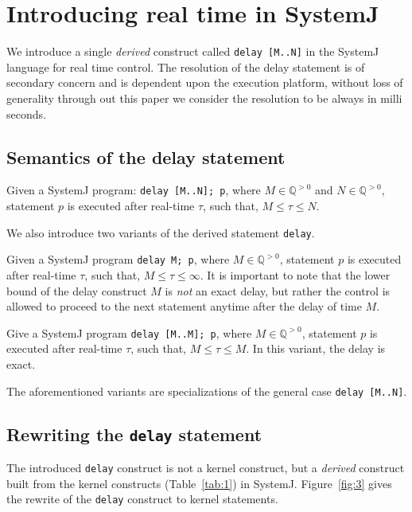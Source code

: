 \section{Introducing real time in SystemJ}
\label{sec:intr-real-time}

We introduce a single \textit{derived} construct called
\mbox{\texttt{delay [M..N]}} in the SystemJ language for real time
control. The resolution of the delay statement is of secondary concern
and is dependent upon the execution platform, without loss of generality
through out this paper we consider the resolution to be always in milli
seconds.

\subsection{Semantics of the delay statement}
\label{sec:semant-delay-stat}

Given a SystemJ program: \texttt{delay [M..N]; p}, where $M \in
\mathbb{Q}^{>0}$ and $N \in \mathbb{Q}^{>0}$, statement $p$ is executed
after real-time $\tau$, such that, $M \leq \tau \leq N$.

We also introduce two variants of the derived statement \texttt{delay}.
\begin{enumerate*}
\item Given a SystemJ program \texttt{delay M; p}, where $M \in
  \mathbb{Q}^{>0}$, statement $p$ is executed after real-time $\tau$,
  such that, $M \leq \tau \leq \infty$. It is important to note that the
  lower bound of the delay construct $M$ is \textit{not} an exact delay,
  but rather the control is allowed to proceed to the next statement
  anytime after the delay of time $M$.
\item Give a SystemJ program \texttt{delay [M..M]; p}, where $M \in
  \mathbb{Q}^{>0}$, statement $p$ is executed after real-time $\tau$,
  such that, $M \leq \tau \leq M$. In this variant, the delay is exact.
\end{enumerate*}

The aforementioned variants are specializations of the general case
\texttt{delay [M..N]}.

\subsection{Rewriting the \texttt{delay} statement}
\label{sec:rewr-delay-stat}

The introduced \texttt{delay} construct is not a kernel construct, but a
\textit{derived} construct built from the kernel constructs
(Table~\ref{tab:1}) in SystemJ. Figure~\ref{fig:3} gives the rewrite of
the \texttt{delay} construct to kernel statements.

